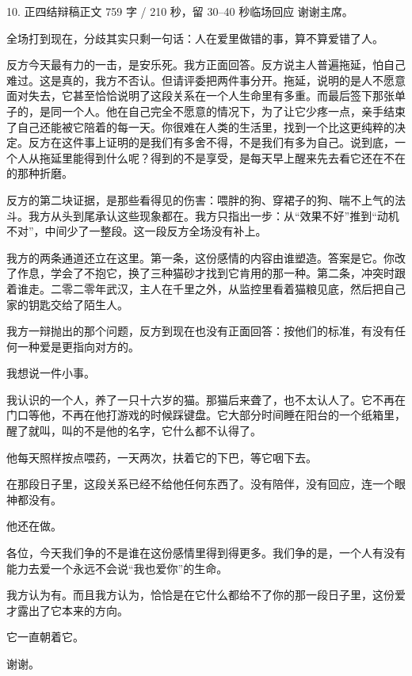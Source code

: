 \documentclass[script,pro]{debate}
\begin{document}
\begin{speech}{10. 正四结辩稿}{正文 759 字 / 210 秒，留 30–40 秒临场回应}
谢谢主席。

全场打到现在，分歧其实只剩一句话：人在爱里做错的事，算不算爱错了人。

反方今天最有力的一击，是安乐死。我方正面回答。反方说主人普遍拖延，怕自己难过。这是真的，我方不否认。但请评委把两件事分开。拖延，说明的是人不愿意面对失去，它甚至恰恰说明了这段关系在一个人生命里有多重。而最后签下那张单子的，是同一个人。他在自己完全不愿意的情况下，为了让它少疼一点，亲手结束了自己还能被它陪着的每一天。你很难在人类的生活里，找到一个比这更纯粹的决定。反方在这件事上证明的是我们有多舍不得，不是我们有多为自己。说到底，一个人从拖延里能得到什么呢？得到的不是享受，是每天早上醒来先去看它还在不在的那种折磨。

反方的第二块证据，是那些看得见的伤害：喂胖的狗、穿裙子的狗、喘不上气的法斗。我方从头到尾承认这些现象都在。我方只指出一步：从“效果不好”推到“动机不对”，中间少了一整段。这一段反方全场没有补上。

我方的两条通道还立在这里。第一条，这份感情的内容由谁塑造。答案是它。你改了作息，学会了不抱它，换了三种猫砂才找到它肯用的那一种。第二条，冲突时跟着谁走。二零二零年武汉，主人在千里之外，从监控里看着猫粮见底，然后把自己家的钥匙交给了陌生人。

我方一辩抛出的那个问题，反方到现在也没有正面回答：按他们的标准，有没有任何一种爱是更指向对方的。

我想说一件小事。

我认识的一个人，养了一只十六岁的猫。那猫后来聋了，也不太认人了。它不再在门口等他，不再在他打游戏的时候踩键盘。它大部分时间睡在阳台的一个纸箱里，醒了就叫，叫的不是他的名字，它什么都不认得了。

他每天照样按点喂药，一天两次，扶着它的下巴，等它咽下去。

在那段日子里，这段关系已经不给他任何东西了。没有陪伴，没有回应，连一个眼神都没有。

他还在做。

各位，今天我们争的不是谁在这份感情里得到得更多。我们争的是，一个人有没有能力去爱一个永远不会说“我也爱你”的生命。

我方认为有。而且我方认为，恰恰是在它什么都给不了你的那一段日子里，这份爱才露出了它本来的方向。

它一直朝着它。

谢谢。

\begin{contingency}
\end{contingency}
\end{speech}
\end{document}
